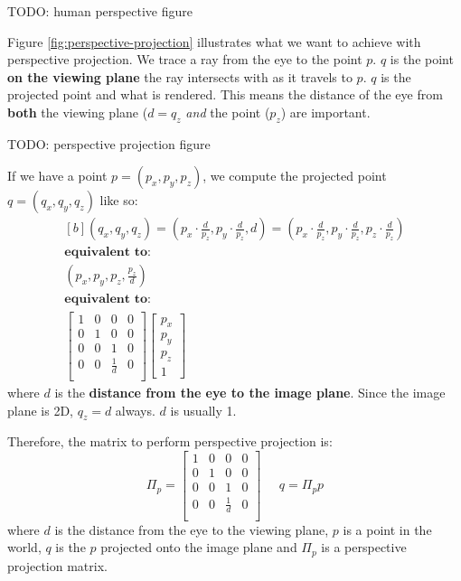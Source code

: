 \documentclass{article}
\begin{document}
TODO: human perspective figure

Figure \ref{fig:perspective-projection} illustrates what we want to achieve with perspective projection. We trace a ray from the eye to the point $p$. $q$ is the point \textbf{on the viewing plane} the ray intersects with as it travels to $p$. $q$ is the projected point and what is rendered. This means the distance of the eye from \textbf{both} the viewing plane ($d = q_z$ \textit{and} the point ($p_z$) are important.

TODO: perspective projection figure

If we have a point $p = (p_x, p_y, p_z)$, we compute the projected point $q = (q_x, q_y, q_z)$ like so:
\begin{equation}
	\begin{aligned}[b]
	(q_x, q_y, q_z) = \left(
		p_x \cdot \frac{d}{p_z}, p_y \cdot \frac{d}{p_z}, d
	\right)
	= \left(
		p_x \cdot \frac{d}{p_z}, p_y \cdot \frac{d}{p_z}, p_z \cdot \frac{d}{p_z}
	\right) \\
	\textbf{equivalent to:} \\
	\left(p_x, p_y, p_z, \frac{p_z}{d} \right) \\
	\textbf{equivalent to:} \\
	\left[ \begin{matrix}
		1 & 0 & 0 & 0 \\
		0 & 1 & 0 & 0 \\
		0 & 0 & 1 & 0 \\
		0 & 0 & \frac{1}{d} & 0 \\		
	\end{matrix} \right]
	\left[ \begin{matrix} p_x \\ p_y \\ p_z \\ 1 \end{matrix} \right]
	\end{aligned}
\end{equation}
where $d$ is the \textbf{distance from the eye to the image plane}. Since the image plane is 2D, $q_z = d$ always. $d$ is usually 1.

Therefore, the matrix to perform perspective projection is:
\begin{equation}
	\Pi_p = \left[ \begin{matrix}
		1 & 0 & 0 & 0 \\
		0 & 1 & 0 & 0 \\
		0 & 0 & 1 & 0 \\
		0 & 0 & \frac{1}{d} & 0 \\
	\end{matrix} \right]
	\;\;\;\;\; q = \Pi_p p
	\label{eq:perspective-projection}
\end{equation}
where $d$ is the distance from the eye to the viewing plane, $p$ is a point in the world, $q$ is the $p$ projected onto the image plane and $\Pi_p$ is a perspective projection matrix.
\end{document}
